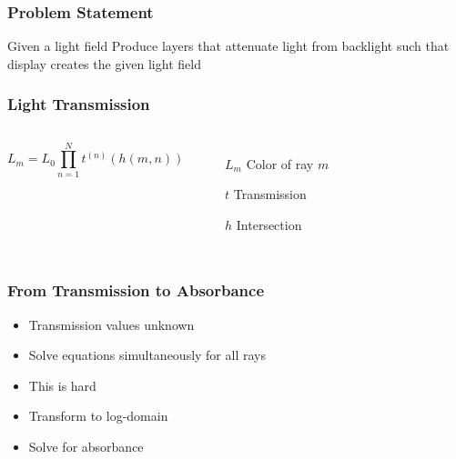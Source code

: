 \documentclass[12pt, compress]{beamer}
\begin{document}
\begin{frame}[fragile]
	\frametitle{Problem Statement}
	{\large
	\begin{block}{Given a light field}
		Produce layers that attenuate light from backlight such that display creates the given light field
	\end{block}
	}
\end{frame}

\begin{frame}[fragile]
	\frametitle{Light Transmission}
	\vspace{1cm}
	\begin{columns}[onlytextwidth]
			
			\begin{equation*}
				L_m = L_0 \prod_{n=1}^{N} t^{(n)} (h(m, n)) 
			\end{equation*}
			\begin{itemize}[<alert@+>]
			    \item[$L_m$] Color of ray $m$
			    \item[$t$] Transmission
			    \item[$h$] Intersection 
			\end{itemize}
	\end{columns}
	\vspace{1cm}
	\begin{center}
	\end{center}
\end{frame}

\begin{frame}[fragile]
	\frametitle{From Transmission to Absorbance}
	
	\begin{itemize}[<+- | alert@+>]
		\item Transmission values unknown
		\item Solve equations simultaneously for all rays
		\item This is hard
		\item Transform to log-domain
		\item Solve for absorbance
	\end{itemize}
	
\end{frame}
\end{document}

